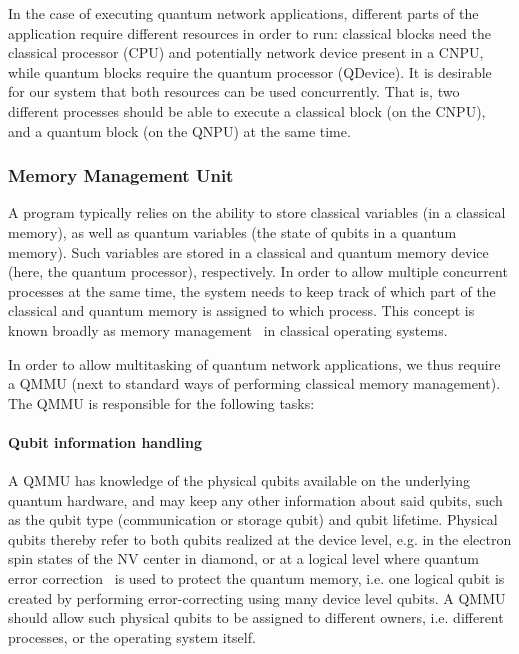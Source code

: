 In the case of executing quantum network applications, different parts of the application require different resources in order to run: classical blocks need the classical processor (\ac{CPU}) and potentially network device present in a \ac{CNPU}, while quantum blocks require the quantum processor (\ac{QDevice}). It is desirable for our system that both resources can be used concurrently. That is, two different processes should be able to execute a classical block (on the \ac{CNPU}), and a quantum block (on the \ac{QNPU}) at the same time.

\subsubsection{Memory Management Unit}

A program typically relies on the ability to store classical variables (in a classical memory), as well as quantum variables (the state of qubits in a quantum memory). Such variables are stored in a classical and quantum memory device (here, the quantum processor), respectively. In order to allow multiple concurrent processes at the same time, the system needs to keep track of which part of the classical and quantum memory is assigned to which process. This concept is known broadly as memory management~\cite[Section 1.7]{silberschatz_book_2014} in classical operating systems.

In order to allow multitasking of quantum network applications, we thus require a \ac{QMMU} (next to standard ways of performing classical memory management). The \ac{QMMU} is responsible for the following tasks:

\paragraph{Qubit information handling} 

A \ac{QMMU} has knowledge of the physical qubits available on the underlying quantum hardware, and may keep any other information about said qubits, such as the qubit type (communication or storage qubit) and qubit lifetime. Physical qubits thereby refer to both qubits realized at the device level, e.g. in the electron spin states of the \ac{NV} center in diamond, or at a logical level where quantum error correction~\cite{lidar2013quantum} is used to protect the quantum memory, i.e. one logical qubit is created by performing error-correcting using many device level qubits. A \ac{QMMU} should allow such physical qubits to be assigned to different owners, i.e. different processes, or the operating system itself. 

